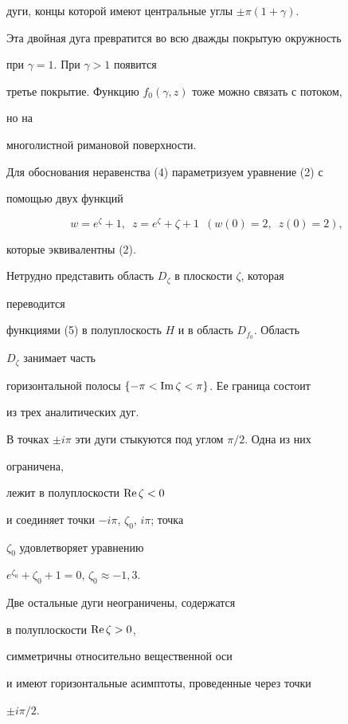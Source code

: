 дуги, концы которой имеют центральные углы $\pm\pi(1+\gamma)$. 


Эта двойная дуга превратится во всю дважды покрытую окружность 


при $\gamma=1$. При $\gamma>1$ появится 


третье покрытие. Функцию $f_0(\gamma,z)$ тоже можно связать с потоком, 


но на 


многолистной римановой поверхности. 


 


Для обоснования неравенства (4) параметризуем уравнение (2) с 


помощью двух функций 


\begin{equation} 


w=e^\zeta+1,\ \; z=e^\zeta +\zeta +1 \ \; 


(w(0)=2,\ \;z(0)=2), 


\end{equation} 


которые эквивалентны (2). 


Нетрудно представить область $D_\zeta$ в плоскости $\zeta$, которая 


переводится 


функциями (5) в полуплоскость $H$ и в область $D_{f_0}$. Область 


$D_\zeta$ занимает часть 


горизонтальной полосы $\{-\pi <\operatorname{Im}\zeta<\pi \}$. Ее граница состоит 


из трех аналитических дуг. 


В точках $\pm i\pi$ эти дуги стыкуются под углом $\pi /2$. Одна из них 


ограничена, 


лежит в полуплоскости $\operatorname{Re}\zeta <0$ 


и соединяет точки $-i\pi$, $\zeta_{0}$, $i\pi$; точка 


$\zeta_0$ удовлетворяет уравнению 


$e^{\zeta_0}+\zeta_0+1=0$, $\zeta_0\approx -1,3$. 


Две остальные дуги неограничены, содержатся 


в полуплоскости $\operatorname{Re}\zeta>0$, 


симметричны относительно вещественной оси 


и имеют горизонтальные асимптоты, проведенные через точки 


$\pm i\pi /2$. 


